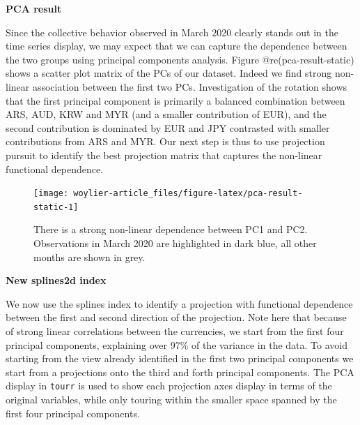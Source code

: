 \textbf{PCA result}

Since the collective behavior observed in March 2020 clearly stands out
in the time series display, we may expect that we can capture the
dependence between the two groups using principal components analysis.
Figure @re(pca-result-static) shows a scatter plot matrix of the PCs of
our dataset. Indeed we find strong non-linear association between the
first two PCs. Investigation of the rotation shows that the first
principal component is primarily a balanced combination between ARS,
AUD, KRW and MYR (and a smaller contribution of EUR), and the second
contribution is dominated by EUR and JPY contrasted with smaller
contributions from ARS and MYR. Our next step is thus to use projection
pursuit to identify the best projection matrix that captures the
non-linear functional dependence.

\begin{Schunk}
\begin{figure}

{\centering \texttt{[image: woylier-article\_files/figure-latex/pca-result-static-1]} 

}

\caption[There is a strong non-linear dependence between PC1 and PC2]{There is a strong non-linear dependence between PC1 and PC2. Observations in March 2020 are highlighted in dark blue, all other months are shown in grey.}\label{fig:pca-result-static}
\end{figure}
\end{Schunk}

\textbf{New splines2d index}

We now use the splines index to identify a projection with functional
dependence between the first and second direction of the projection.
Note here that because of strong linear correlations between the
currencies, we start from the first four principal components,
explaining over 97\% of the variance in the data. To avoid starting from
the view already identified in the first two principal components we
start from a projections onto the third and forth principal components.
The PCA display in \texttt{tourr} is used to show each projection axes
display in terms of the original variables, while only touring within
the smaller space spanned by the first four principal components.

